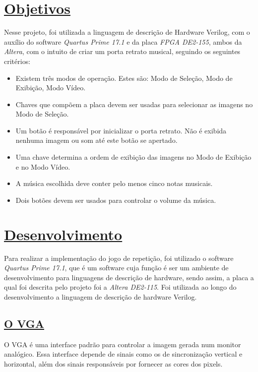 \documentclass[14pt, oneside]{book}
\newcommand\tab[1][1cm]{\hspace*{#1}}
\theoremstyle{definition}
\begin{document}
        \chapter[Objetivos]{\hypertarget{obj}{}\hyperlink{toc}{Objetivos}}
             \tab Nesse projeto, foi utilizada a linguagem de descrição de Hardware Verilog, com o auxílio do software \textit{Quartus Prime 17.1} e da placa \textit{FPGA DE2-155}, ambos da \textit{Altera}, com o intuito de criar um porta retrato musical, seguindo os seguintes critérios:
            \begin{itemize}
                \item Existem três modos de operação. Estes são: Modo de Seleção, Modo de Exibição, Modo Vídeo.
                \item Chaves que compõem a placa devem ser usadas para selecionar as imagens no Modo de Seleção.
                \item Um botão é responsável por inicializar o porta retrato. Não é exibida nenhuma imagem ou som até este botão se apertado.
                \item Uma chave determina a ordem de exibição das imagens no Modo de Exibição e no Modo Vídeo.
                \item A música escolhida deve conter pelo menos cinco notas musicais.
                \item Dois botões devem ser usados para controlar o volume da música.
            \end{itemize}
            
            
        \chapter[Desenvolvimento]{\hyperlink{toc}{Desenvolvimento}}
            \tab Para realizar a implementação do jogo de repetição, foi utilizado o software \textit{Quartus Prime 17.1}, que é um software cuja função é ser um ambiente de desenvolvimento para linguagens de descrição de hardware, sendo assim, a placa a qual foi descrita pelo projeto foi a \textit{Altera DE2-115}. Foi utilizada ao longo do desenvolvimento a linguagem de descrição de hardware Verilog. \\
    
            
            \section[O VGA]{\hyperlink{toc}{O VGA}}
            \tab O VGA é uma interface padrão para controlar a imagem gerada num monitor analógico. Essa interface depende de sinais como os de sincronização vertical e horizontal, além dos sinais responsáveis por fornecer as cores dos pixels.
            
\end{document}
